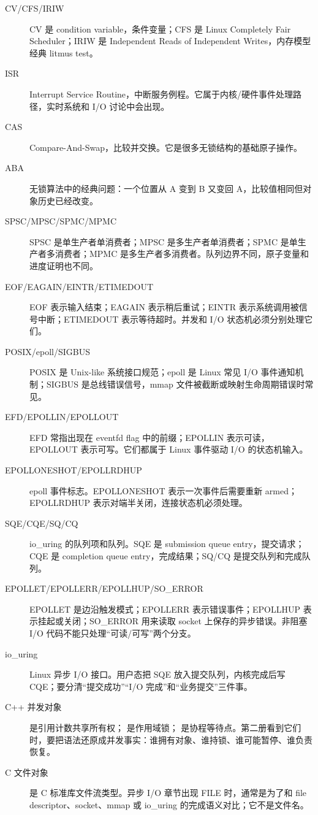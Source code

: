 \begin{description}
  \item[CV/CFS/IRIW] CV 是 condition variable，条件变量；CFS 是 Linux Completely Fair Scheduler；IRIW 是 Independent Reads of Independent Writes，内存模型经典 litmus test。
  \item[ISR] Interrupt Service Routine，中断服务例程。它属于内核/硬件事件处理路径，实时系统和 I/O 讨论中会出现。
  \item[CAS] Compare-And-Swap，比较并交换。它是很多无锁结构的基础原子操作。
  \item[ABA] 无锁算法中的经典问题：一个位置从 A 变到 B 又变回 A，比较值相同但对象历史已经改变。
  \item[SPSC/MPSC/SPMC/MPMC] SPSC 是单生产者单消费者；MPSC 是多生产者单消费者；SPMC 是单生产者多消费者；MPMC 是多生产者多消费者。队列边界不同，原子变量和进度证明也不同。
  \item[EOF/EAGAIN/EINTR/ETIMEDOUT] EOF 表示输入结束；EAGAIN 表示稍后重试；EINTR 表示系统调用被信号中断；ETIMEDOUT 表示等待超时。并发和 I/O 状态机必须分别处理它们。
  \item[POSIX/epoll/SIGBUS] POSIX 是 Unix-like 系统接口规范；epoll 是 Linux 常见 I/O 事件通知机制；SIGBUS 是总线错误信号，mmap 文件被截断或映射生命周期错误时常见。
  \item[EFD/EPOLLIN/EPOLLOUT] EFD 常指出现在 eventfd flag 中的前缀；EPOLLIN 表示可读，EPOLLOUT 表示可写。它们都属于 Linux 事件驱动 I/O 的状态机输入。
  \item[EPOLLONESHOT/EPOLLRDHUP] epoll 事件标志。EPOLLONESHOT 表示一次事件后需要重新 armed；EPOLLRDHUP 表示对端半关闭，连接状态机必须处理。
  \item[SQE/CQE/SQ/CQ] io\_uring 的队列项和队列。SQE 是 submission queue entry，提交请求；CQE 是 completion queue entry，完成结果；SQ/CQ 是提交队列和完成队列。
  \item[EPOLLET/EPOLLERR/EPOLLHUP/SO\_ERROR] EPOLLET 是边沿触发模式；EPOLLERR 表示错误事件；EPOLLHUP 表示挂起或关闭；SO\_ERROR 用来读取 socket 上保存的异步错误。非阻塞 I/O 代码不能只处理“可读/可写”两个分支。
  \item[io\_uring] Linux 异步 I/O 接口。用户态把 SQE 放入提交队列，内核完成后写 CQE；要分清“提交成功”“I/O 完成”和“业务提交”三件事。
  \item[C++ 并发对象]  是引用计数共享所有权； 是作用域锁； 是协程等待点。第二册看到它们时，要把语法还原成并发事实：谁拥有对象、谁持锁、谁可能暂停、谁负责恢复。
  \item[C 文件对象]  是 C 标准库文件流类型。异步 I/O 章节出现 FILE 时，通常是为了和 file descriptor、socket、mmap 或 io\_uring 的完成语义对比；它不是文件名。

\end{description}
